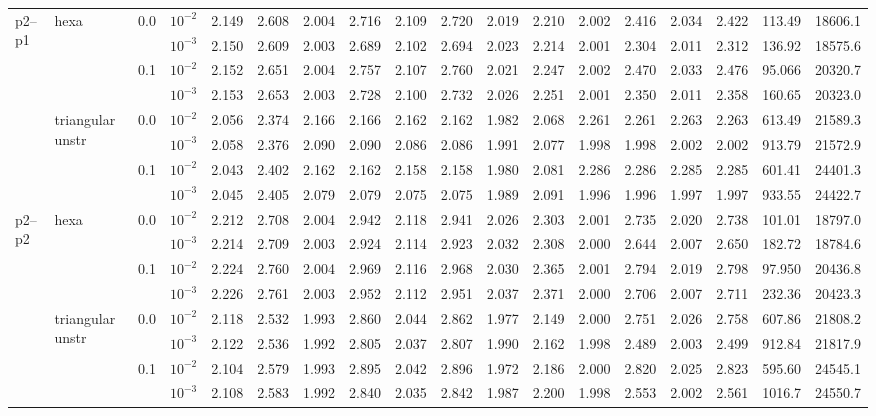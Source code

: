 \begin{longtable}{llclrrrrrrrrrrrrrr}
\multirow{8}{*}{p2--p1} & \multirow{4}{*}{hexa} & \multirow{2}{*}{0.0} & $10^{-2}$ & 2.149 & 2.608 & 2.004 & 2.716 & 2.109 & 2.720 & 2.019 & 2.210 & 2.002 & 2.416 & 2.034 & 2.422 & 113.49 & 18606.1 \\
& & & $10^{-3}$ & 2.150 & 2.609 & 2.003 & 2.689 & 2.102 & 2.694 & 2.023 & 2.214 & 2.001 & 2.304 & 2.011 & 2.312 & 136.92 & 18575.6 \\\cline{3-18}
& & \multirow{2}{*}{0.1} & $10^{-2}$ & 2.152 & 2.651 & 2.004 & 2.757 & 2.107 & 2.760 & 2.021 & 2.247 & 2.002 & 2.470 & 2.033 & 2.476 & 95.066 & 20320.7 \\
& & & $10^{-3}$ & 2.153 & 2.653 & 2.003 & 2.728 & 2.100 & 2.732 & 2.026 & 2.251 & 2.001 & 2.350 & 2.011 & 2.358 & 160.65 & 20323.0 \\\cline{2-18}
& \multirow{4}{*}{triangular unstr} & \multirow{2}{*}{0.0} & $10^{-2}$ & 2.056 & 2.374 & 2.166 & 2.166 & 2.162 & 2.162 & 1.982 & 2.068 & 2.261 & 2.261 & 2.263 & 2.263 & 613.49 & 21589.3 \\
& & & $10^{-3}$ & 2.058 & 2.376 & 2.090 & 2.090 & 2.086 & 2.086 & 1.991 & 2.077 & 1.998 & 1.998 & 2.002 & 2.002 & 913.79 & 21572.9 \\\cline{3-18}
& & \multirow{2}{*}{0.1} & $10^{-2}$ & 2.043 & 2.402 & 2.162 & 2.162 & 2.158 & 2.158 & 1.980 & 2.081 & 2.286 & 2.286 & 2.285 & 2.285 & 601.41 & 24401.3 \\
& & & $10^{-3}$ & 2.045 & 2.405 & 2.079 & 2.079 & 2.075 & 2.075 & 1.989 & 2.091 & 1.996 & 1.996 & 1.997 & 1.997 & 933.55 & 24422.7 \\\hline

\multirow{8}{*}{p2--p2} & \multirow{4}{*}{hexa} & \multirow{2}{*}{0.0} & $10^{-2}$ & 2.212 & 2.708 & 2.004 & 2.942 & 2.118 & 2.941 & 2.026 & 2.303 & 2.001 & 2.735 & 2.020 & 2.738 & 101.01 & 18797.0 \\
& & & $10^{-3}$ & 2.214 & 2.709 & 2.003 & 2.924 & 2.114 & 2.923 & 2.032 & 2.308 & 2.000 & 2.644 & 2.007 & 2.650 & 182.72 & 18784.6 \\\cline{3-18}
& & \multirow{2}{*}{0.1} & $10^{-2}$ & 2.224 & 2.760 & 2.004 & 2.969 & 2.116 & 2.968 & 2.030 & 2.365 & 2.001 & 2.794 & 2.019 & 2.798 & 97.950 & 20436.8 \\
& & & $10^{-3}$ & 2.226 & 2.761 & 2.003 & 2.952 & 2.112 & 2.951 & 2.037 & 2.371 & 2.000 & 2.706 & 2.007 & 2.711 & 232.36 & 20423.3 \\\cline{2-18}
& \multirow{4}{*}{triangular unstr} & \multirow{2}{*}{0.0} & $10^{-2}$ & 2.118 & 2.532 & 1.993 & 2.860 & 2.044 & 2.862 & 1.977 & 2.149 & 2.000 & 2.751 & 2.026 & 2.758 & 607.86 & 21808.2 \\
& & & $10^{-3}$ & 2.122 & 2.536 & 1.992 & 2.805 & 2.037 & 2.807 & 1.990 & 2.162 & 1.998 & 2.489 & 2.003 & 2.499 & 912.84 & 21817.9 \\\cline{3-18}
& & \multirow{2}{*}{0.1} & $10^{-2}$ & 2.104 & 2.579 & 1.993 & 2.895 & 2.042 & 2.896 & 1.972 & 2.186 & 2.000 & 2.820 & 2.025 & 2.823 & 595.60 & 24545.1 \\
& & & $10^{-3}$ & 2.108 & 2.583 & 1.992 & 2.840 & 2.035 & 2.842 & 1.987 & 2.200 & 1.998 & 2.553 & 2.002 & 2.561 & 1016.7 & 24550.7 \\\hline


\end{longtable}
